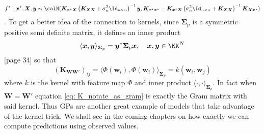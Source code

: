 \begin{equation} \label{eq: comput_f_ast_3}
    f^{\star} \mid \bm{x}^{\star} , \bm{X} , \bm{y} \sim \calN ( \bm{K}_{\bm{x}^{\star} \bm{X}} \left( \bm{K}_{\bm{X} \bm{X}} + \sigma_n^{2} \Id_{n \times n} \right)^{-1} \bm{y} , \bm{K}_{\bm{x}^{\star} \bm{x}^{\star}} - \bm{K}_{\bm{x}^{\star} \bm{X}} \left( \sigma_n^{2} \Id_{n \times n} + \bm{K}_{\bm{X} \bm{X}} \right)^{-1} \bm{K}_{\bm{X} \bm{x}^{\star}} )
\end{equation}
. To get a better idea of the connection to kernels, since $\bm{\Sigma}_p$ is a symmetric positive semi definite matrix, it defines an inner product
\[
    \langle \bm{x} , \bm{y} \rangle_{\bm{\Sigma}_p} = \bm{y}^{\ast} \bm{\Sigma}_p \bm{x}, \quad \bm{x} , \bm{y} \in \KK^{N}
\]
\cite{WangGuorongGITa}[page 34] so that
\begin{equation} \label{eq: K_notate_as_gram}
    \left( \bm{K}_{\bm{W} \bm{W}'} \right)_{ij} = \langle \Phi \left( \bm{w}_i \right) ,\Phi \left( \bm{w}_i \right) \rangle_{\bm{\Sigma}_p} = k \left( \bm{w}_i , \bm{w}_j \right)
\end{equation}
where $k$ is the kernel with feature map $\Phi$ and inner product $\langle \cdot , \cdot \rangle_{\bm{\Sigma}_p}$. In fact when $\bm{W} = \bm{W}'$ equation \ref{eq: K_notate_as_gram} is exactly the Gram matrix with said kernel. Thus GPs are another great example of models that take advantage of the kernel trick. We shall see in the coming chapters on how exactly we can compute predictions using observed values.